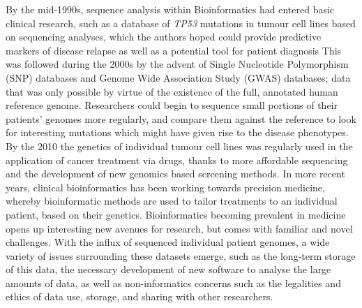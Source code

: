 By the mid-1990s, sequence analysis within Bioinformatics had entered basic clinical research\cite{Maojo_2003}, such as a database of \emph{TP53} mutations in tumour cell lines based on sequencing analyses, which the authors hoped could provide predictive markers of disease relapse as well as a potential tool for patient diagnosis\cite{Hainaut_1997}
This was followed during the 2000s by the advent of Single Nucleotide Polymorphism (SNP) databases\cite{Johnson_2009} and Genome Wide Association Study (GWAS) databases\cite{Klein_2005}; data that was only possible by virtue of the existence of the full, annotated human reference genome.
Researchers could begin to sequence small portions of their patients' genomes more regularly, and compare them against the reference to look for interesting mutations which might have given rise to the disease phenotypes\cite{Esplin_2014,Prokop_2018}.
By the 2010 the genetics of individual tumour cell lines was regularly used in the application of cancer treatment via drugs, thanks to more affordable sequencing and the development of new genomics based screening methods\cite{Hamburg_2010}.
In more recent years, clinical bioinformatics has been working towards precision medicine, whereby bioinformatic methods are used to tailor treatments to an individual patient, based on their genetics\cite{Phillips_2020}.
Bioinformatics becoming prevalent in medicine opens up interesting new avenues for research, but comes with familiar and novel challenges.
With the influx of sequenced individual patient genomes, a wide variety of issues surrounding these datasets emerge, such as the long-term storage of this data, the necessary development of new software to analyse the large amounts of data, as well as non-informatics concerns such as the legalities and ethics of data use, storage, and sharing with other researchers\cite{Manrai_2017}.


